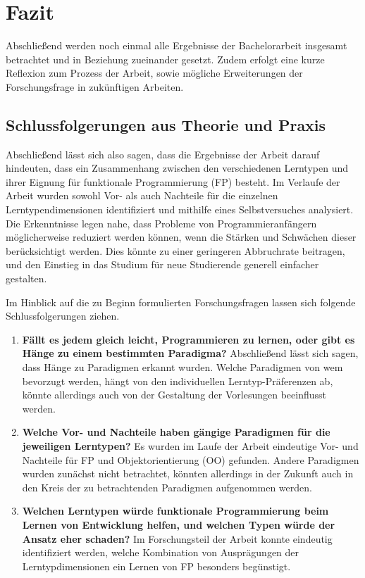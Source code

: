 \clearpage
\section{Fazit}
\label{sec:conclusion}

Abschließend werden noch einmal alle Ergebnisse der Bachelorarbeit insgesamt betrachtet und in Beziehung zueinander gesetzt. Zudem erfolgt eine kurze Reflexion zum Prozess der Arbeit, sowie mögliche Erweiterungen der Forschungsfrage in zukünftigen Arbeiten.

\subsection{Schlussfolgerungen aus Theorie und Praxis}
Abschließend lässt sich also sagen, dass die Ergebnisse der Arbeit darauf hindeuten, dass ein Zusammenhang zwischen den verschiedenen Lerntypen und ihrer Eignung für funktionale Programmierung (FP) besteht.
Im Verlaufe der Arbeit wurden sowohl Vor- als auch Nachteile für die einzelnen Lerntypendimensionen identifiziert und mithilfe eines Selbstversuches analysiert. Die Erkenntnisse legen nahe, dass Probleme von Programmieranfängern möglicherweise reduziert werden können, wenn die Stärken und Schwächen dieser berücksichtigt werden. Dies könnte zu einer geringeren Abbruchrate beitragen, und den Einstieg in das Studium für neue Studierende generell einfacher gestalten.

Im Hinblick auf die zu Beginn formulierten Forschungsfragen lassen sich folgende Schlussfolgerungen ziehen.

\begin{enumerate}
    \item \textbf{Fällt es jedem gleich leicht, Programmieren zu lernen, oder gibt es Hänge zu einem bestimmten Paradigma?} Abschließend lässt sich sagen, dass Hänge zu Paradigmen erkannt wurden. Welche Paradigmen von wem bevorzugt werden, hängt von den individuellen Lerntyp-Präferenzen ab, könnte allerdings auch von der Gestaltung der Vorlesungen beeinflusst werden.
    \item \textbf{Welche Vor- und Nachteile haben gängige Paradigmen für die jeweiligen Lerntypen?} Es wurden im Laufe der Arbeit eindeutige Vor- und Nachteile für FP und Objektorientierung (OO) gefunden. Andere Paradigmen wurden zunächst nicht betrachtet, könnten allerdings in der Zukunft auch in den Kreis der zu betrachtenden Paradigmen aufgenommen werden.
    \item \textbf{Welchen Lerntypen würde funktionale Programmierung beim Lernen von Entwicklung helfen, und welchen Typen würde der Ansatz eher schaden?} Im Forschungsteil der Arbeit konnte eindeutig identifiziert werden, welche Kombination von Ausprägungen der Lerntypdimensionen ein Lernen von FP besonders begünstigt.
\end{enumerate}

